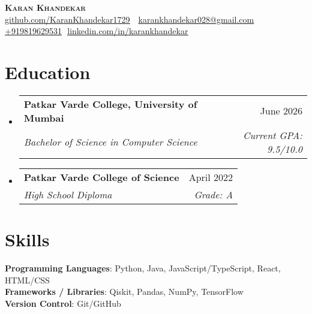 \documentclass[letterpaper,11pt]{article}
\makeatletter
\newcommand{\resumeSubheading}[4]{
  \vspace{-2pt}\item
    \begin{tabular*}{0.97\textwidth}[t]{l@{\extracolsep{\fill}}r}
      \textbf{#1} & #2 \\
      \textit{\small#3} & \textit{\small #4} \\
    \end{tabular*}\vspace{-7pt}
}
\newcommand{\resumeSubHeadingListStart}{\begin{itemize}[leftmargin=0.15in, label={}]}
\newcommand{\resumeSubHeadingListEnd}{\end{itemize}}
\makeatother
\begin{document}
\begin{flushright}
  \vspace{-4pt}
\end{flushright}

\vspace{-7pt}

\begin{center}
    \textbf{\Huge \scshape Karan Khandekar} \\ \vspace{8pt}
    \small 
    \faGithub
    \href{github.com/KaranKhandekar1729}{\underline{github.com/KaranKhandekar1729}} $  $
    \faEnvelope$  $
    \href{mailto:karankhandekar028@gmail.com}
    {\underline{karankhandekar028@gmail.com}}
    \faPhone$  $
    \underline{+919819629531}
    \faLinkedin$  $
    \href{linkedin.com/in/karankhandekar}{\underline{linkedin.com/in/karankhandekar}} $  $
\end{center}

\section{Education}
  \resumeSubHeadingListStart
    \resumeSubheading
        {Patkar Varde College, University of Mumbai}{June 2026}
        {Bachelor of Science in Computer Science}{Current GPA: 9.5/10.0}
  
    \resumeSubheading
      {Patkar Varde College of Science}{April 2022}
      {High School Diploma}{Grade: A}
      

  \resumeSubHeadingListEnd

\section{Skills}
\begin{itemize}[leftmargin=0.15in, label={}]
\small{\item{
    \textbf{Programming Languages}{: Python, Java, JavaScript/TypeScript, React, HTML/CSS} \\
    
    \textbf{Frameworks / Libraries}{: Qiskit, Pandas, NumPy, TensorFlow} \\
    
    \textbf{Version Control}{: Git/GitHub} \\
}}
\end{itemize}
\end{document}
